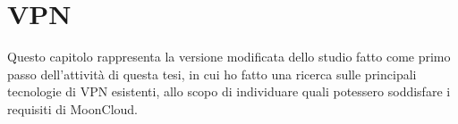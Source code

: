 \chapter{VPN}

Questo capitolo rappresenta la versione modificata dello studio fatto
come primo passo dell'attività di questa tesi, in cui ho fatto una ricerca
sulle principali tecnologie di VPN esistenti, allo scopo di individuare
quali potessero soddisfare i requisiti di MoonCloud.\\







